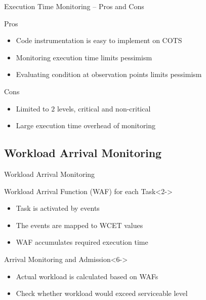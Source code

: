 \begin{frame}{Execution Time Monitoring -- Pros and Cons}

\begin{block}{Pros}
\begin{itemize}
    \item<2-> Code instrumentation is easy to implement on COTS
    \item<3-> Monitoring execution time limits pessimism
    \item<4-> Evaluating condition at observation points limits pessimism
\end{itemize}
\end{block}

\vfill

\begin{block}{Cons}
\begin{itemize}
    \item<5-> Limited to $2$ levels, critical and non-critical
    \item<6-> Large execution time overhead of monitoring
\end{itemize}
\end{block}

\end{frame}


\subsection{Workload Arrival Monitoring}

\begin{frame}{Workload Arrival Monitoring}

\begin{block}{Workload Arrival Function (WAF) for each Task}<2->
\begin{itemize}
    \item<3-> Task is activated by events
    \item<4-> The events are mapped to WCET values
    \item<5-> WAF accumulates required execution time
\end{itemize}
\end{block}

\begin{block}{Arrival Monitoring and Admission}<6->
\begin{itemize}
    \item<7-> Actual workload is calculated based on WAFs
    \item<8-> Check whether workload would exceed serviceable level
\end{itemize}
\end{block}


\end{frame}


